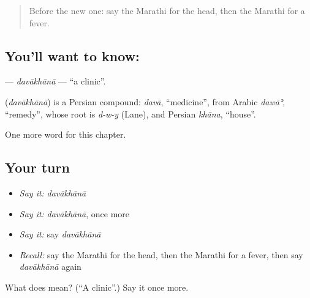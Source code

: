 \label{lesson:MR-C72-davakhana}



\begin{quote}
Before the new one: say the Marathi for the head, then the Marathi for a fever.
\end{quote}

\subsection*{You'll want to know: }
\textbf{} — \emph{davākhānā} — \textquotedblleft{}a clinic\textquotedblright{}.

\begin{cousinweb}
\textbf{} (\emph{davākhānā}) is a Persian compound: \emph{davā}, \textquotedblleft{}medicine\textquotedblright{}, from Arabic \emph{dawāʾ}, \textquotedblleft{}remedy\textquotedblright{}, whose root is \emph{d-w-y} (Lane), and Persian \emph{khāna}, \textquotedblleft{}house\textquotedblright{}.
\end{cousinweb}

\begin{grammarlens}[title={What you've built}]
One more word for this chapter.
\end{grammarlens}

\subsection*{Your turn}
\begin{itemize}
\raggedright
  \item \emph{Say it:} \emph{davākhānā}
  \item \emph{Say it:} \emph{davākhānā}, once more
  \item \emph{Say it:} say \emph{davākhānā}
  \item \emph{Recall:} say the Marathi for the head, then the Marathi for a fever, then say \emph{davākhānā} again
\end{itemize}

\begin{tcolorbox}[breakable,colback=teal!4,colframe=teal!35!black,title={Before you move on}]
What does  mean? (\textquotedblleft{}A clinic\textquotedblright{}.) Say it once more.
\end{tcolorbox}
